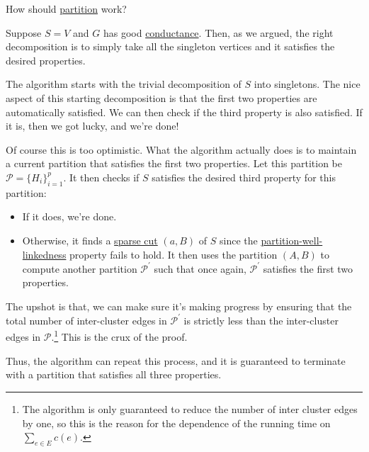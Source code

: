 \begin{problem*}
	How should \hyperref[algo:partition]{partition} work?
\end{problem*}
\begin{answer}
	Suppose \(S = V\) and \(G\) has good \hyperref[def:conductance]{conductance}. Then, as we argued, the right decomposition is to simply take all the singleton vertices and it satisfies the desired properties.

	\begin{intuition}[Optimistism]
		The algorithm starts with the trivial decomposition of \(S\) into singletons. The nice aspect of this starting decomposition is that the first two properties are automatically satisfied. We can then check if the third property is also satisfied. If it is, then we got lucky, and we're done!
	\end{intuition}

	Of course this is too optimistic. What the algorithm actually does is to maintain a current partition that satisfies the first two properties. Let this partition be \(\mathcal{P} = \{ H_i \} _{i=1}^{p}\). It then checks if \(S\) satisfies the desired third property for this partition:
	\begin{itemize}
		\item If it does, we're done.
		\item Otherwise, it finds a \hyperref[prb:sparsest-cut]{sparse cut} \((a, B)\) of \(S\) since the \hyperref[def:partition-and-boundary-well-linked]{partition-well-linkedness} property fails to hold. It then uses the partition \((A, B)\) to compute another partition \(\mathcal{P} ^{\prime} \) such that once again, \(\mathcal{P} ^{\prime} \) satisfies the first two properties.
	\end{itemize}
	\begin{intuition}
		The upshot is that, we can make sure it's making progress by ensuring that the total number of inter-cluster edges in \(\mathcal{P} ^{\prime} \) is strictly less than the inter-cluster edges in \(\mathcal{P} \).\footnote{The algorithm is only guaranteed to reduce the number of inter cluster edges by one, so this is the reason for the dependence of the running time on \(\sum_{e \in E} c(e)\).} This is the crux of the proof.
	\end{intuition}

	Thus, the algorithm can repeat this process, and it is guaranteed to terminate with a partition that satisfies all three properties.
\end{answer}

